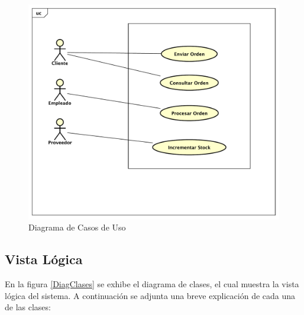         \newpage
        \begin{figure}[!Hhtb]                                             
            \centering                                                   
            \includegraphics[width=15cm,origin=c]{Imagenes/Casos_De_Uso.pdf}        
            \caption{Diagrama de Casos de Uso} \label{DiagCU}
        \end{figure}

    \newpage
    \subsection{Vista Lógica}
        En la figura \ref{DiagClases} se exhibe el diagrama de clases, el cual
        muestra la vista lógica del sistema. A continuación se adjunta una 
        breve explicación de cada una de las clases:

